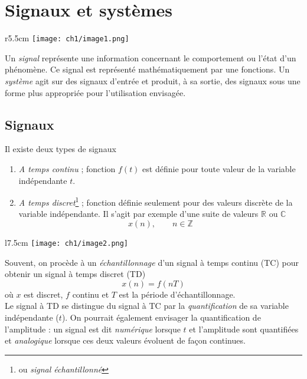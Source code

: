 \chapter{Signaux et systèmes}
\begin{wrapfigure}[5]{r}{5.5cm}
\vspace{-5mm}
\texttt{[image: ch1/image1.png]}
\end{wrapfigure}
Un \textit{signal} représente une information concernant le comportement ou l'état 
d'un phénomène. Ce signal est représenté mathématiquement par une fonctions. Un 
\textit{système} agit sur des signaux d’entrée et produit, à sa sortie, des signaux 
sous une forme plus appropriée pour l’utilisation envisagée.

\section{Signaux}
Il existe deux types de signaux
\begin{enumerate}
\item \textit{A temps continu} ; fonction $f(t)$ est définie pour toute valeur de 
la variable indépendante $t$.
\item \textit{A temps discret}\footnote{ou \textit{signal échantillonné}} ; fonction 
définie seulement pour des valeurs discrète de la variable indépendante. Il s'agit 
par exemple d'une suite de valeurs $\mathbb{R}$ ou $\mathbb{C}$ 
\begin{equation}
x(n),\qquad n \in\mathbb{Z}
\end{equation}
\end{enumerate}

\begin{wrapfigure}[8]{l}{7.5cm}
\vspace{-10mm}
\texttt{[image: ch1/image2.png]}
\end{wrapfigure}
Souvent, on procède à un \textit{échantillonnage} d'un signal à temps continu (TC) pour 
obtenir un signal à temps discret (TD) 
\begin{equation}
x(n) = f(nT)
\end{equation}
où $x$ est discret, $f$ continu et $T$ est la période d’échantillonnage.\\

Le signal à TD se distingue du signal à TC par la \textit{quantification} de sa variable 
indépendante ($t$). On pourrait également envisager la quantification de l'amplitude : un 
signal est dit \textit{numérique} lorsque $t$ et l'amplitude sont quantifiées et 
\textit{analogique} lorsque ces deux valeurs évoluent de façon continues.

